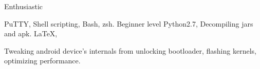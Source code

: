 \begin{skillsentries}
      \skillsentry
      {Enthusiastic} %
      {
        \begin{skillsitems} %
          \item {PuTTY, Shell scripting, Bash, zsh. Beginner level Python2.7, Decompiling jars and apk. LaTeX,}
          \item {Tweaking android device's internals from unlocking bootloader, flashing kernels, optimizing performance.}
        \end{skillsitems}
      }
\end{skillsentries}
